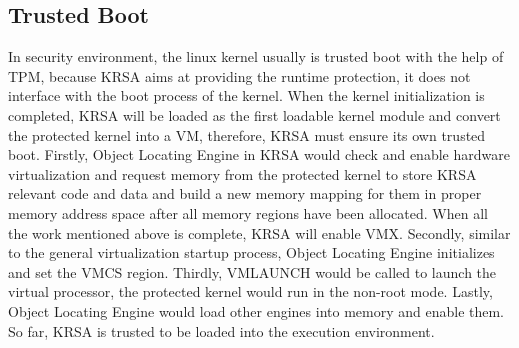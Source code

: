 \documentclass[conference]{IEEEtran}
\begin{document}
\subsection{Trusted Boot} \label{section:trustedboot}
In security environment, the linux kernel usually is trusted boot with the help of TPM, because KRSA aims at providing the runtime protection, it does not interface with the boot process of the kernel. When the kernel initialization is completed, KRSA will be loaded as the first loadable kernel module and convert the protected kernel into a VM, therefore, KRSA must ensure its own trusted boot.
Firstly, Object Locating Engine in KRSA would check and enable hardware virtualization and request memory from the protected kernel to store KRSA relevant code and data and build a new memory mapping for them in proper memory address space after all memory regions have been allocated. When all the work mentioned above is complete, KRSA will enable VMX. Secondly, similar to the general virtualization startup process, Object Locating Engine initializes and set the VMCS region. Thirdly, VMLAUNCH would be called to launch the virtual processor, the protected kernel would run in the non-root mode. Lastly, Object Locating Engine would load other engines into memory and enable them. So far, KRSA is trusted to be loaded into the execution environment. 


\end{document}
